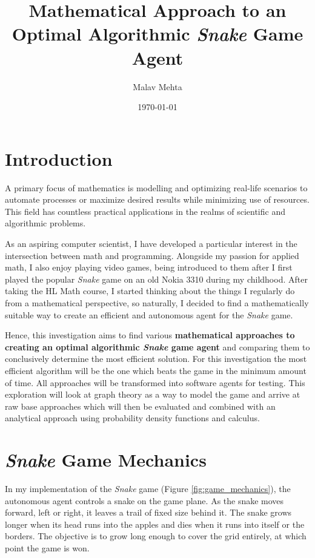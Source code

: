 \documentclass[12pt]{article}
\title{Mathematical Approach to an Optimal Algorithmic \textit{Snake} Game Agent}
\author{Malav Mehta}
\date{\today}
\begin{document}
\begin{singlespace}
\maketitle
\thispagestyle{empty}
\tableofcontents
\end{singlespace}

\clearpage
\setcounter{page}{1}
\pagebreak


\section{Introduction}

A primary focus of mathematics is modelling and optimizing real-life scenarios to automate processes or maximize desired results while minimizing use of resources. This field has countless practical applications in the realms of scientific and algorithmic problems.

As an aspiring computer scientist, I have developed a particular interest in the intersection between math and programming. Alongside my passion for applied math, I also enjoy playing video games, being introduced to them after I first played the popular \textit{Snake} game on an old Nokia 3310 during my childhood. After taking the HL Math course, I started thinking about the things I regularly do from a mathematical perspective, so naturally, I decided to find a mathematically suitable way to create an efficient and autonomous agent for the \textit{Snake} game.

Hence, this investigation aims to find various \textbf{mathematical approaches to creating an optimal algorithmic \textit{Snake} game agent} and comparing them to conclusively determine the most efficient solution. For this investigation the most efficient algorithm will be the one which beats the game in the minimum amount of time. All approaches will be transformed into software agents for testing. This exploration will look at graph theory as a way to model the game and arrive at raw base approaches which will then be evaluated and combined with an analytical approach using probability density functions and calculus. 

\section{\textit{Snake} Game Mechanics}

In my implementation of the \textit{Snake} game (Figure \ref{fig:game_mechanics}), the autonomous agent controls a snake on the game plane. As the snake moves forward, left or right, it leaves a trail of fixed size behind it. The snake grows longer when its head runs into the apples and dies when it runs into itself or the borders. The objective is to grow long enough to cover the grid entirely, at which point the game is won.
\end{document}
